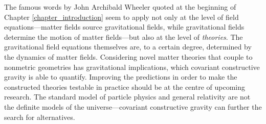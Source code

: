 The famous words by John Archibald Wheeler quoted at the beginning of Chapter \ref{chapter_introduction} seem to apply not only at the level of field equations---matter fields source gravitational fields, while gravitational fields determine the motion of matter fields---but also at the level of \emph{theories}. The gravitational field equations themselves are, to a certain degree, determined by the dynamics of matter fields. Considering novel matter theories that couple to nonmetric geometries has gravitational implications, which covariant constructive gravity is able to quantify. Improving the predictions in order to make the constructed theories testable in practice should be at the centre of upcoming research. The standard model of particle physics and general relativity are not the definite models of the universe---covariant constructive gravity can further the search for alternatives.
